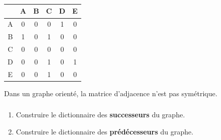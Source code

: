 \documentclass[svgnames,11pt]{beamer}
\begin{document}
\begin{frame}
    \frametitle{}

    \begin{center}
        \begin{tabular}{c|*{5}{c}}
              & A                      & B                       & C                    & D & E \\
            \hline
            A & 0                      & \cellcolor{LightGray} 0 & 0 &\cellcolor{SkyBlue} 1 & 0 \\
            B & \cellcolor{LightGray}1 & 0                       & 1                    & 0 & 0 \\
            C & 0   & 0                       & 0                    & 0 & 0 \\
            D & \cellcolor{SkyBlue}0                      & 0                       & 1                    & 0 & 1 \\
            E & 0                      & 0                       & 1                    & 0 & 0 \\
        \end{tabular}
    \end{center}
    \begin{aretenir}[Remarque]
        Dans un graphe orienté, la matrice d'adjacence n'est pas symétrique.
    \end{aretenir}

\end{frame}
\begin{frame}
    \frametitle{}
    \begin{center}
    \end{center}
    \begin{activite}
    \begin{enumerate}
        \item Construire le dictionnaire des \textbf{successeurs} du graphe.
        \item Construire le dictionnaire des \textbf{prédécesseurs} du graphe.
    \end{enumerate}
    \end{activite}

\end{frame}
\end{document}
